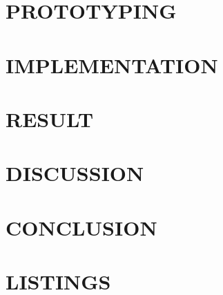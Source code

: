 \documentclass[12pt, twoside]{report}
\makeatletter
\newcommand\AppendixName{Appendix}
\let\oldappendix\appendix
\renewcommand{\appendix}{%
  \oldappendix
  \renewcommand{\chaptername}{\AppendixName}  \renewcommand{\thechapter}{\@Alph\c@chapter}}
\makeatother
\begin{document}
\chapter{PROTOTYPING}


\chapter{IMPLEMENTATION}

	
\chapter{RESULT}

	
\chapter{DISCUSSION}

	
\chapter{CONCLUSION}





\appendix
\chapter{LISTINGS}

\end{document}

